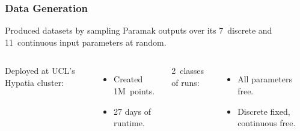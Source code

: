 \begin{frame}
	\frametitle{Data Generation}
	Produced datasets by sampling Paramak outputs over its
	7~discrete and 11~continuous input parameters at random.

	\begin{columns}[T]

		\vspace{10pt}

		Deployed at UCL's Hypatia cluster:
		\begin{itemize}
			\setlength\itemsep{0.5em}
			\item Created \alert{1M~points.}
			\item \alert{27 days} of runtime.
		\end{itemize}

		\vspace{13pt}

		2~classes of runs:
		\begin{itemize}
			\setlength\itemsep{0.5em}
			\item All parameters free.
			\item Discrete fixed, continuous free.
		\end{itemize}

		\vspace{10pt}



\end{columns}
\end{frame}

